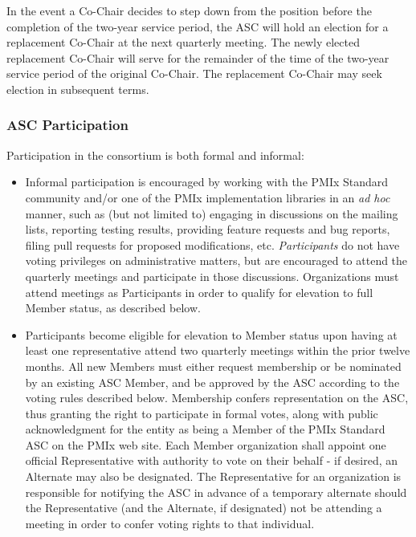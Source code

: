 \documentclass{article}
\begin{document}
In the event a Co-Chair decides to step down from the position before
the completion of the two-year service period, the ASC will hold an
election for a replacement Co-Chair at the next quarterly meeting. The
newly elected replacement Co-Chair will serve for the remainder of the
time of the two-year service period of the original Co-Chair. The
replacement Co-Chair may seek election in subsequent terms.

\subsubsection{ASC Participation}\label{gov-asc-participation}
Participation in the consortium is both formal and informal:

\begin{itemize}
\item
  Informal participation is encouraged by working with the PMIx Standard
  community and/or one of the PMIx implementation libraries in an
  \emph{ad hoc} manner, such as (but not limited to) engaging in
  discussions on the mailing lists, reporting testing results, providing
  feature requests and bug reports, filing pull requests for proposed
  modifications, etc. \textit{Participants} do not have voting
  privileges on administrative matters, but are encouraged to attend the
  quarterly meetings and participate in those discussions. Organizations
  must attend meetings as Participants in order to qualify for elevation
  to full Member status, as described below.
\item
  Participants become eligible for elevation to Member status upon
  having at least one representative attend two quarterly meetings
  within the prior twelve months. All new Members must either request
  membership or be nominated by an existing ASC Member, and be approved
  by the ASC according to the voting rules described below. Membership
  confers representation on the ASC, thus granting the right to
  participate in formal votes, along with public acknowledgment for the
  entity as being a Member of the PMIx Standard ASC on the PMIx web
  site. Each Member organization shall appoint one official
  Representative with authority to vote on their behalf - if desired, an
  Alternate may also be designated. The Representative for an
  organization is responsible for notifying the ASC in advance of a
  temporary alternate should the Representative (and the Alternate, if
  designated) not be attending a meeting in order to confer voting
  rights to that individual.


\end{itemize}
\end{document}
